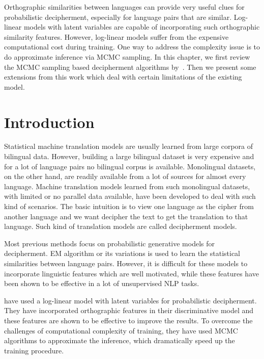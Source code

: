Orthographic similarities between languages can provide very useful clues for probabilistic decipherment, especially for language pairs that are similar.
Log-linear models with latent variables are capable of incorporating such orthographic similarity features. 
However, log-linear models suffer from the expensive computational cost during training. 
One way to address the complexity issue is to do approximate inference via MCMC sampling. 
In this chapter, we first review the MCMC sampling based decipherment algorithms by~. Then we present some extensions from this work
which deal with certain limitations of the existing model.
\section{Introduction}
Statistical machine translation models are usually learned from large corpora of bilingual data.
However, building a large bilingual dataset is very expensive and for a lot of language pairs no bilingual corpus is available.
Monolingual datasets, on the other hand, are readily available from a lot of sources for almost every language.
Machine translation models learned from such monolingual datasets, with limited or no parallel data available, have been developed to deal with such kind of scenarios. The basic intuition is 
to view one language as the cipher from another language and we want decipher the text to get the translation to that language. Such kind of translation models are called decipherment models.


Most previous methods focus on probabilistic generative models for decipherment. EM algorithm or its variations is used to learn
the statistical similarities between language pairs. However, it is difficult for these models to incorporate linguistic features which are
well motivated, while these features have been shown to be effective in a lot of unsupervised NLP tasks.
 

 have used a log-linear model with latent variables for probabilistic decipherment.
They have incorporated orthographic features in their discriminative model and these features are shown to be effective to improve the results.
To overcome the challenges of computational complexity of training, they have used MCMC algorithms to approximate the inference, which dramatically speed up the training procedure.


